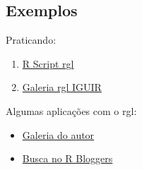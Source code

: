 
\subsection{Exemplos}

\begin{frame}

  Praticando:
  \begin{enumerate}
  \item \href{run:./R/rgl/rgl.R}{R Script rgl}
  \item \href{run:./rgl/RGL.html}{Galeria rgl IGUIR}
  \end{enumerate}

  \vspace{0.5cm}
  Algumas aplicações com o rgl:
  \begin{itemize}
  \item \href{http://cran.r-project.org/web/packages/rgl/vignettes/}{Galeria
      do autor}
  \item \href{http://www.r-bloggers.com/?s=rgl}{Busca no R Bloggers}
  \end{itemize}

\end{frame}
